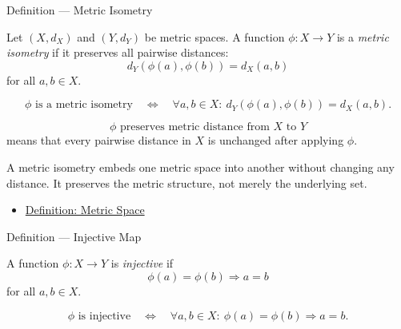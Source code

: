 \begin{definitionbox}{Definition --- Metric Isometry}
\begin{definition}\label{def:metric-isometry}
Let \((X,d_X)\) and \((Y,d_Y)\) be metric spaces.  A function
\(\phi:X\to Y\) is a \emph{metric isometry} if it preserves all pairwise
distances:
\[
  d_Y(\phi(a),\phi(b))=d_X(a,b)
\]
for all \(a,b\in X\).
\end{definition}
\end{definitionbox}

\begin{remark*}
\[
\phi\text{ is a metric isometry}
\quad\Longleftrightarrow\quad
\forall a,b\in X{:}\ d_Y(\phi(a),\phi(b))=d_X(a,b).
\]
\end{remark*}

\begin{remark*}
\[
\phi\text{ preserves metric distance from }X\text{ to }Y
\]
means that every pairwise distance in \(X\) is unchanged after applying
\(\phi\).
\end{remark*}

\begin{remark*}[Interpretation]
A metric isometry embeds one metric space into another without changing any
distance.  It preserves the metric structure, not merely the underlying set.
\end{remark*}


\begin{dependencies}
\begin{itemize}
  \item \hyperref[def:metric-space]{Definition: Metric Space}
\end{itemize}
\end{dependencies}

\begin{definitionbox}{Definition --- Injective Map}
\begin{definition}\label{def:injective-map}
A function \(\phi:X\to Y\) is \emph{injective} if
\[
  \phi(a)=\phi(b)\Longrightarrow a=b
\]
for all \(a,b\in X\).
\end{definition}
\end{definitionbox}

\begin{remark*}
\[
\phi\text{ is injective}
\quad\Longleftrightarrow\quad
\forall a,b\in X{:}\ \phi(a)=\phi(b)\Longrightarrow a=b.
\]
\end{remark*}

